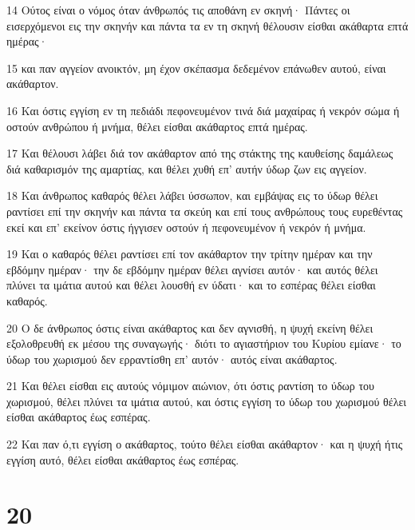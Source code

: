 \par 14 Ούτος είναι ο νόμος όταν άνθρωπός τις αποθάνη εν σκηνή· Πάντες οι εισερχόμενοι εις την σκηνήν και πάντα τα εν τη σκηνή θέλουσιν είσθαι ακάθαρτα επτά ημέρας·
\par 15 και παν αγγείον ανοικτόν, μη έχον σκέπασμα δεδεμένον επάνωθεν αυτού, είναι ακάθαρτον.
\par 16 Και όστις εγγίση εν τη πεδιάδι πεφονευμένον τινά διά μαχαίρας ή νεκρόν σώμα ή οστούν ανθρώπου ή μνήμα, θέλει είσθαι ακάθαρτος επτά ημέρας.
\par 17 Και θέλουσι λάβει διά τον ακάθαρτον από της στάκτης της καυθείσης δαμάλεως διά καθαρισμόν της αμαρτίας, και θέλει χυθή επ' αυτήν ύδωρ ζων εις αγγείον.
\par 18 Και άνθρωπος καθαρός θέλει λάβει ύσσωπον, και εμβάψας εις το ύδωρ θέλει ραντίσει επί την σκηνήν και πάντα τα σκεύη και επί τους ανθρώπους τους ευρεθέντας εκεί και επ' εκείνον όστις ήγγισεν οστούν ή πεφονευμένον ή νεκρόν ή μνήμα.
\par 19 Και ο καθαρός θέλει ραντίσει επί τον ακάθαρτον την τρίτην ημέραν και την εβδόμην ημέραν· την δε εβδόμην ημέραν θέλει αγνίσει αυτόν· και αυτός θέλει πλύνει τα ιμάτια αυτού και θέλει λουσθή εν ύδατι· και το εσπέρας θέλει είσθαι καθαρός.
\par 20 Ο δε άνθρωπος όστις είναι ακάθαρτος και δεν αγνισθή, η ψυχή εκείνη θέλει εξολοθρευθή εκ μέσου της συναγωγής· διότι το αγιαστήριον του Κυρίου εμίανε· το ύδωρ του χωρισμού δεν ερραντίσθη επ' αυτόν· αυτός είναι ακάθαρτος.
\par 21 Και θέλει είσθαι εις αυτούς νόμιμον αιώνιον, ότι όστις ραντίση το ύδωρ του χωρισμού, θέλει πλύνει τα ιμάτια αυτού, και όστις εγγίση το ύδωρ του χωρισμού θέλει είσθαι ακάθαρτος έως εσπέρας.
\par 22 Και παν ό,τι εγγίση ο ακάθαρτος, τούτο θέλει είσθαι ακάθαρτον· και η ψυχή ήτις εγγίση αυτό, θέλει είσθαι ακάθαρτος έως εσπέρας.

\chapter{20}

